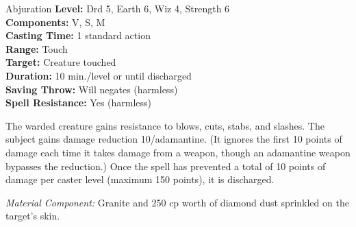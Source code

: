 {Abjuration}
{
	\textbf{Level:}
	Drd 5, Earth 6, Wiz 4, Strength 6\\
	\textbf{Components:}
	V, S, M\\
	\textbf{Casting Time:}
	1 standard action\\
	\textbf{Range:}
	Touch\\
	\textbf{Target:}
	Creature touched\\
	\textbf{Duration:}
	10 min./level or until discharged\\
	\textbf{Saving Throw:}
	Will negates (harmless)\\
	\textbf{Spell Resistance:}
	Yes (harmless)\\
}
{
	The warded creature gains resistance to blows, cuts, stabs, and slashes. The subject gains damage reduction 10/adamantine. (It ignores the first 10 points of damage each time it takes damage from a weapon, though an adamantine weapon bypasses the reduction.) Once the spell has prevented a total of 10 points of damage per caster level (maximum 150 points), it is discharged.

	\textit{Material Component:}
	Granite and 250 cp worth of diamond dust sprinkled on the target's skin.

}
